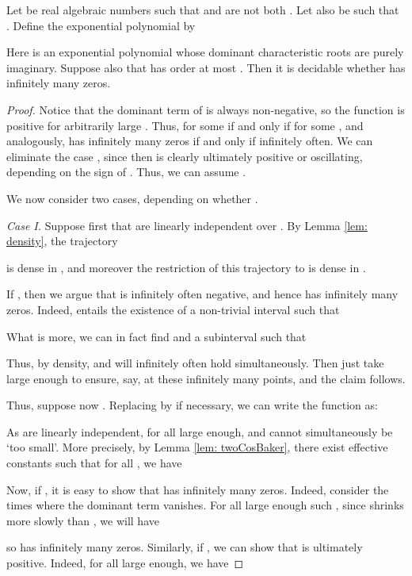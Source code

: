 \begin{lemma}\label{lem: layered}
Let  be real algebraic numbers such that 
 and  are not both .
Let also  be
such that
.  
Define the exponential polynomial  by

Here  is an exponential polynomial whose
dominant characteristic roots are purely imaginary. Suppose also
that  has order at most .
Then it is decidable whether  has infinitely many
zeros. 
\end{lemma}
\begin{proof}
Notice that the dominant term of  is always non-negative, so the
function is positive for arbitrarily large . Thus,  for
some  if and only if  for some , and analogously,
 has infinitely many zeros if and only if 
infinitely often. We can eliminate the 
case , since then  is clearly ultimately positive 
or oscillating, depending on the sign of . 
Thus, we can assume .


We now consider two cases, depending on whether .

\emph{Case I.}
Suppose first that  are linearly independent over
. By Lemma \ref{lem: density}, the trajectory
 
is dense in , and moreover the restriction
of this trajectory to  is
dense in . 

If , then we argue that  is infinitely often 
negative, and hence has infinitely many zeros.
Indeed,  entails the existence of a non-trivial interval 
 such that 

What is more, we can in fact find  and a subinterval 
 such that
 
Thus, by density, 
 and 
will infinitely often hold simultaneously. Then just take  large enough to 
ensure, say,  at these infinitely
many points, and the claim follows.

Thus, suppose now . Replacing  by  
if necessary, we can write the function as:

As  are linearly independent, 
for all  large enough,  and 
cannot simultaneously be `too small'. More precisely, by Lemma \ref{lem: twoCosBaker}, 
there exist effective constants  such that for all ,
we have

Now, if , it is easy
to show that  has infinitely many zeros. Indeed, consider the
times  where the dominant term 
vanishes. For all large enough such , since  shrinks more 
slowly than , we will have 

so  has infinitely many zeros.
Similarly, if , we can show that  is
ultimately positive.  Indeed, for all  large enough, 
we have


\end{proof}
